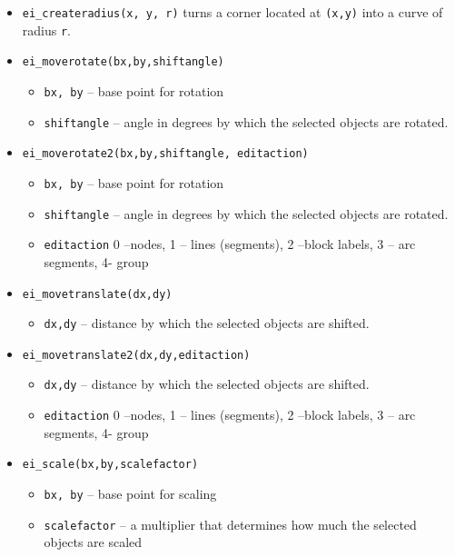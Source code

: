 \begin{itemize}
\item{\tt ei\_createradius(x, y, r)} turns a corner located at {\tt (x,y)} into a curve of radius {\tt r}.

\item{\tt ei\_moverotate(bx,by,shiftangle)}
        \begin{itemize}
        \item{\tt bx, by} -- base point for rotation
        \item{\tt shiftangle} -- angle in degrees by which the selected objects are rotated.
        \end{itemize}

\item{\tt ei\_moverotate2(bx,by,shiftangle, editaction)}
        \begin{itemize}
        \item{\tt bx, by} -- base point for rotation
        \item{\tt shiftangle} -- angle in degrees by which the selected objects are rotated.
        \item{\tt editaction}  0 --nodes, 1 -- lines (segments), 2 --block labels, 3 -- arc
                segments, 4- group
        \end{itemize}

\item{\tt ei\_movetranslate(dx,dy)}
        \begin{itemize}
        \item{\tt dx,dy} -- distance by which the selected objects are shifted.
        \end{itemize}

\item{\tt ei\_movetranslate2(dx,dy,editaction)}
        \begin{itemize}
        \item{\tt dx,dy} -- distance by which the selected objects are shifted.
        \item{\tt editaction}  0 --nodes, 1 -- lines (segments), 2 --block labels, 3 -- arc
                segments, 4- group
        \end{itemize}

\item{\tt ei\_scale(bx,by,scalefactor)}
        \begin{itemize}
        \item{\tt bx, by} -- base point for scaling
        \item{\tt scalefactor} -- a multiplier that determines how
        much the selected objects are scaled
        \end{itemize}


\end{itemize}
